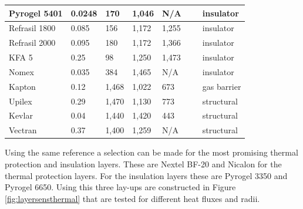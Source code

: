 \begin{table}[H]
\begin{tabular}{|l|l|l|l|l|l|l|}
		Pyrogel 5401      & 0.0248                                                & 170                                        & 1,046                                            & N/A  	 & ~          & insulator                                 \\ \hline
		Refrasil 1800      & 0.085                                                 & 156                                        & 1,172                                            & 1,255 	 & ~           & insulator                                \\ \hline
		Refrasil 2000      & 0.095                                                 & 180                                        & 1,172                                            & 1,366 	 & ~            & insulator                               \\ \hline
		KFA 5             & 0.25                                                  & 98                                         & 1,250                                            & 1,473 	 & ~        & insulator                                   \\ \hline
		Nomex             & 0.035                                                  & 384                                         & 1,465                                            & N/A 	 & ~        & insulator                                   \\ \hline
		Kapton            & 0.12                                                  & 1,468                                       & 1,022                                            & 673	 & ~            & gas barrier                              \\ \hline
		Upilex            & 0.29                                                  & 1,470                                       & 1,130                                            & 773 	 & ~             & structural                            \\ \hline
		Kevlar            & 0.04 & 1,440                                       & 1,420                                            & 443 	 & ~             & structural                            \\ \hline
		Vectran            & 0.37 & 1,400 & 1,259 & N/A 	 &  & structural                            \\ \hline
	\end{tabular}
	\label{tab:tpsmatprop}
\end{table}

Using the same reference a selection can be made for the most promising thermal protection and insulation layers. These are Nextel BF-20 and Nicalon for the thermal protection layers. For the insulation layers these are Pyrogel 3350 and Pyrogel 6650. Using this three lay-ups are constructed in Figure \ref{fig:layersensthermal} that are tested for different heat fluxes and radii.


